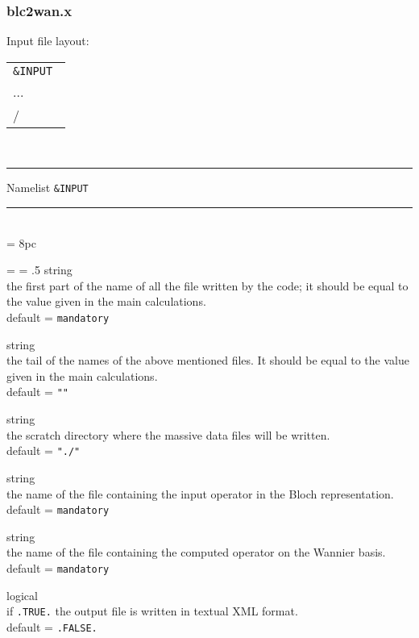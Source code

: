 \subsubsection{blc2wan.x}
\noindent Input file layout: \\

%
%
\begin{tabular}{l}
  {\tt \&INPUT } \\
  ... \\
  / \\
\end{tabular}
%
%
\\

\begin{centering}
\rule{2.2in}{0.01in} Namelist {\tt \&INPUT} \rule{2.2in}{0.01in}
\end{centering}\\

\newdimen\descindent \descindent = 8pc
{\noindent \leftskip = \descindent \parskip = .5\baselineskip
{}%
{\sc string} \\ the first part of the name of all the file written by the code;
              it should be equal to the value given in the main calculations.\\
              {\sc default} = {\tt mandatory} \par

\noindent{}%
{\sc string} \\ the tail of the names of the above mentioned files. 
              It should be equal to the value given in the main calculations.\\
              {\sc default} = {\tt ""} \par

\noindent{}%
{\sc string} \\ the scratch directory where the massive data files will be written.\\
              {\sc default} = {\tt "./"} \par

\noindent{}%
{\sc string} \\ the name of the file containing the input operator in the Bloch 
                representation.\\
              {\sc default} = {\tt mandatory} \par

\noindent{}%
{\sc string} \\ the name of the file containing the computed operator on the 
                Wannier basis.\\
              {\sc default} = {\tt mandatory} \par

\noindent{}%
{\sc logical} \\ if {\tt .TRUE.} the output file is written in textual XML format.\\
              {\sc default} = {\tt .FALSE.} \par
}
